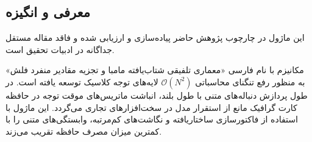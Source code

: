 \subsection{معرفی و انگیزه}
این ماژول در چارچوب پژوهش حاضر پیاده‌سازی و ارزیابی شده و فاقد مقاله مستقل جداگانه در ادبیات تحقیق است.

مکانیزم  با نام فارسی «معماری تلفیقی شتاب‌یافته مامبا و تجزیه مقادیر منفرد فلش» به منظور رفع تنگنای محاسباتی $\mathcal{O}(N^2)$ لایه‌های توجه کلاسیک توسعه یافته است. در طول پردازش دنباله‌های متنی با طول بلند، انباشت ماتریس‌های موقت توجه در حافظه کارت گرافیک مانع از استقرار مدل در سخت‌افزارهای تجاری می‌گردد. این ماژول با استفاده از فاکتورسازی ساختاریافته و نگاشت‌های کم‌مرتبه، وابستگی‌های متنی را با کمترین میزان مصرف حافظه تقریب می‌زند.
